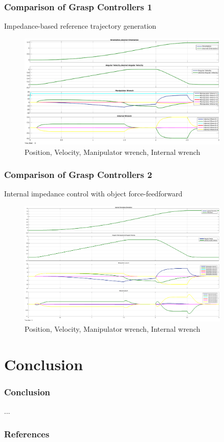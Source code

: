 \documentclass[student]{ITRslides}
\begin{document}
\begin{frame}
	\frametitle{Comparison of Grasp Controllers 1}
Impedance-based reference trajectory generation \cite{Caccavale_01}
 \begin{figure}[htb]
			\centering
			\includegraphics[width=0.9\textwidth]{Caccavaleorientation.eps}
			\caption{Position, Velocity, Manipulator wrench, Internal wrench}
\end{figure}
\end{frame}

\begin{frame}
	\frametitle{Comparison of Grasp Controllers 2}
Internal impedance control with object force-feedforward \cite{DePascali_15}
 \begin{figure}[htb]
			\centering
			\includegraphics[width=0.9\textwidth]{Depascaliorientation.eps}
			\caption{Position, Velocity, Manipulator wrench, Internal wrench}
\end{figure}
\end{frame}

\section{Conclusion}

\begin{frame}
	\frametitle{Conclusion}
	...
\end{frame}
\appendix
\begin{frame}
	\frametitle{References}
	\printbibliography
\end{frame}
\end{document}
